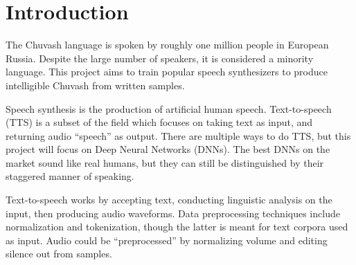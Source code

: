 \documentclass[fleqn,10pt]{SelfArx} %
\affiliation{\textsuperscript{†}\textit{Computer Science; School of Informatics, Computing and Engineering, Indiana University, Bloomington, IN, USA}} %
\begin{document}
\flushbottom %
\maketitle %
\tableofcontents %
\thispagestyle{empty} %

	




\section{Introduction}
The Chuvash language is spoken by roughly one million people in European Russia\cite{russianBureauStatistics}. Despite the large number of speakers, it is considered a minority language. This project aims to train popular speech synthesizers to produce intelligible Chuvash from written samples.

Speech synthesis is the production of artificial human speech\cite{speechSynthesis}. Text-to-speech (TTS) is a subset of the field which focuses on taking text as input, and returning audio ``speech'' as output. There are multiple ways to do TTS, but this project will focus on Deep Neural Networks (DNNs). The best DNNs on the market sound like real humans, but they can still be distinguished by their staggered manner of speaking.

Text-to-speech works by accepting text, conducting linguistic analysis on the input, then producing audio waveforms. Data preprocessing techniques include normalization and tokenization\cite{lexAnalysis}, though the latter is meant for text corpora used as input. Audio could be ``preprocessed'' by normalizing volume and editing silence out from samples.
\end{document}
